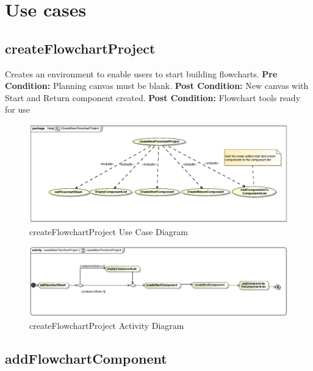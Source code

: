 \documentclass[12pt,a4paper,titlepage]{article}
\begin{document}
\newpage
\section{Use cases}

\subsection{createFlowchartProject}
Creates an environment to enable users to start building flowcharts.\newline\newline
\textbf{Pre Condition:} Planning canvas must be blank.\newline\newline
\textbf{Post Condition:} New canvas with Start and Return component created.\newline
\textbf{Post Condition:} Flowchart tools ready for use\newline

\begin{figure}[H]
  \centering
\includegraphics[width=500px]{createNewFlowchartProject.eps}
\caption{createFlowchartProject Use Case Diagram}
\end{figure}

\begin{figure}[H]
  \centering
\includegraphics[width=500px]{createNewFlowchartProjectActivity.eps}
\caption{createFlowchartProject Activity Diagram}
\end{figure}

\newpage
\subsection{addFlowchartComponent}
\end{document}
